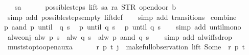 \begin{isabellebody}
\ \ \ sa\ {\isasymnoteq}\ {}\ {\isasymLongrightarrow}\isanewline
\ \ \ possible{\isacharunderscore}steps\ lift\ sa\ ra\ STR\ {\isacharprime}{\isacharprime}opendoor{\isacharprime}{\isacharprime}\ b\ {\isacharequal}\ {\isacharbraceleft}{\isacharbar}{\isacharbar}{\isacharbraceright}{\isachardoublequoteclose}\isanewline
%
\isadelimproof
\ \ %
\endisadelimproof
%
\isatagproof
{}\isamarkupfalse%
\ {\isacharparenleft}simp\ add{\isacharcolon}\ possible{\isacharunderscore}steps{\isacharunderscore}empty\ lift{\isacharunderscore}def{\isacharparenright}\isanewline
\ \ \isamarkupfalse%
\ {\isacharparenleft}simp\ add{\isacharcolon}\ transitions{\isacharparenright}%
\endisatagproof
{\isafoldproof}%
%
\isadelimproof
\isanewline
%
\endisadelimproof
\isanewline
{}\isamarkupfalse%
\ combine{\isacharcolon}\isanewline
{\isachardoublequoteopen}{\isacharparenleft}{\isacharparenleft}p\ aand\ p{\isacharprime}{\isacharparenright}\ until\ \ q{\isacharparenright}\ s\ {\isasymLongrightarrow}\isanewline
\ {\isacharparenleft}p\ until\ q{\isacharparenright}\ s\ {\isasymLongrightarrow}\isanewline
\ {\isacharparenleft}p{\isacharprime}\ until\ q{\isacharparenright}\ s{\isachardoublequoteclose}\isanewline
%
\isadelimproof
\ \ %
\endisadelimproof
%
\isatagproof
{}\isamarkupfalse%
\ {\isacharparenleft}simp\ add{\isacharcolon}\ until{\isacharunderscore}mono{\isacharparenright}%
\endisatagproof
{\isafoldproof}%
%
\isadelimproof
\isanewline
%
\endisadelimproof
\isanewline
{}\isamarkupfalse%
\ alw{\isacharunderscore}conj{\isacharcolon}\ {\isachardoublequoteopen}alw\ p\ s\ {\isasymLongrightarrow}\ alw\ q\ s\ {\isasymLongrightarrow}\ alw\ {\isacharparenleft}p\ aand\ q{\isacharparenright}\ s{\isachardoublequoteclose}\isanewline
%
\isadelimproof
\ \ %
\endisadelimproof
%
\isatagproof
{}\isamarkupfalse%
\ {\isacharparenleft}simp\ add{\isacharcolon}\ alw{\isacharunderscore}iff{\isacharunderscore}sdrop{\isacharparenright}%
\endisatagproof
{\isafoldproof}%
%
\isadelimproof
\isanewline
%
\endisadelimproof
\isanewline
{}\isamarkupfalse%
\ must{\isacharunderscore}stop{\isacharunderscore}to{\isacharunderscore}open{\isacharunderscore}aux{}a{\isacharcolon}\isanewline
\ \ \ \ \ {\isachardoublequoteopen}{\isasymexists}\ r\ p\ t{\isachardot}\ j\ {\isacharequal}\ {\isacharparenleft}make{\isacharunderscore}full{\isacharunderscore}observation\ lift\ {\isacharparenleft}Some\ {}{\isacharparenright}\ r\ p\ t{\isacharparenright}{\isachardoublequoteclose}\isanewline

\end{isabellebody}
